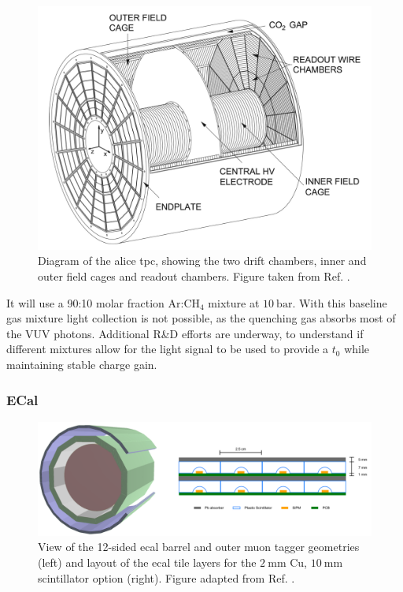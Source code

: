 \begin{figure}[t]
	\centering
	\includegraphics[width=0.7\linewidth]{Images/ND-GAr/alice_tpc}
	\caption[Diagram of the \gls{alice} \gls{tpc}, showing the two drift chambers, inner and outer field cages and readout chambers.]{Diagram of the \gls{alice} \gls{tpc}, showing the two drift chambers, inner and outer field cages and readout chambers. Figure taken from Ref. \cite{DUNE2021NDCDR}.}
	\label{fig:alice_tpc}
\end{figure}

It will use a 90:10 molar fraction $\mathrm{Ar}$:$\mathrm{CH}_{4}$ mixture at $10~\mathrm{bar}$. With this baseline gas mixture light collection is not possible, as the quenching gas absorbs most of the VUV photons. Additional R\&D efforts are underway, to understand if different mixtures allow for the light signal to be used to provide a $t_{0}$ while maintaining stable charge gain.

\subsubsection{ECal}

\begin{figure}[t]
	\centering
	\includegraphics[width=0.99\linewidth]{Images/ND-GAr/ndgar_ecal}
	\caption[View of the 12-sided \gls{ecal} barrel and outer muon tagger geometries of \gls{ndgar}.]{View of the 12-sided \gls{ecal} barrel and outer muon tagger geometries (left) and layout of the \gls{ecal} tile layers for the $2~\mathrm{mm}$ Cu, $10~\mathrm{mm}$ scintillator option (right). Figure adapted from Ref. \cite{DUNE2021NDCDR}.}
	\label{fig:ndgar_ecal}
\end{figure}

